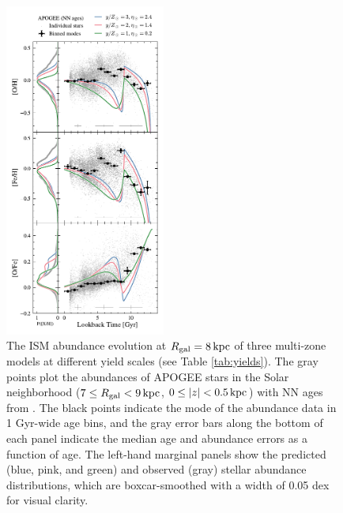 \documentclass[twocolumn,twocolappendix,linenumbers]{aastex631}
\newcommand{\kpc}{\,{\rm kpc}}
\newcommand{\onecolumn}{0.47\textwidth}
\begin{document}
\begin{figure}
    \centering
    \includegraphics[width=\onecolumn]{figures/gas_abundance_evolution.pdf}
    \caption{The ISM abundance evolution at $R_{\rm gal}=8\kpc$ of three multi-zone models at different yield scales (see Table \ref{tab:yields}). The gray points plot the abundances of APOGEE stars in the Solar neighborhood ($7\leq R_{\rm gal}<9\kpc$, $0\leq|z|<0.5\kpc$) with NN ages from \citet{leung_variational_2023}. The black points indicate the mode of the abundance data in 1 Gyr-wide age bins, and the gray error bars along the bottom of each panel indicate the median age and abundance errors as a function of age. The left-hand marginal panels show the predicted (blue, pink, and green) and observed (gray) stellar abundance distributions, which are boxcar-smoothed with a width of 0.05 dex for visual clarity.
}
\end{figure}
\end{document}

